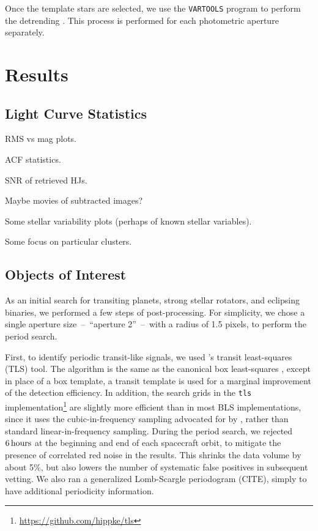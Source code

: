 \documentclass[12pt,twocolumn,tighten]{aastex62}
\begin{document}
Once the template stars are selected, we use the \texttt{VARTOOLS}
program to perform the detrending \citep{Hartman_Bakos_2016}.
This process is performed for each photometric aperture
separately.


\section{Results}
\label{sec:results}

\subsection{Light Curve Statistics}

RMS vs mag plots.

ACF statistics.

SNR of retrieved HJs.

Maybe movies of subtracted images?

Some stellar variability plots (perhaps of known stellar variables).

Some focus on particular clusters.

\subsection{Objects of Interest}
\label{subsec:ctois}

As an initial search for transiting planets, strong stellar rotators, and 
eclipsing binaries, we performed a few steps of post-processing. For 
simplicity,
we chose a single aperture size~--~``aperture 2''~--~with a radius of 1.5 
pixels, to perform the period search.

First, to identify periodic transit-like signals, we used 
\citet{hippke_TLS_2019}'s transit least-squares (TLS) tool.
The algorithm is the same as the canonical box least-squares
\citep{kovacs_box-fitting_2002}, except in place of a box template, a transit 
template is used  for a marginal improvement of the detection efficiency.
In addition, the search grids in the \texttt{tls} 
implementation\footnote{\url{https://github.com/hippke/tls}} are slightly more 
efficient than in most BLS implementations, since it uses the 
cubic-in-frequency sampling advocated for by \citet{ofir_optimizing_2014}, 
rather than standard linear-in-frequency sampling.
During the period search, we rejected $6\,{\rm hours}$ at the
beginning and end of each spacecraft orbit, to mitigate the presence
of correlated red noise in the results.
This shrinks the data volume by about 5\%, but also lowers the number
of systematic false positives in subsequent vetting.
We also ran a generalized Lomb-Scargle periodogram (CITE), simply to 
have additional periodicity information.
\end{document}
